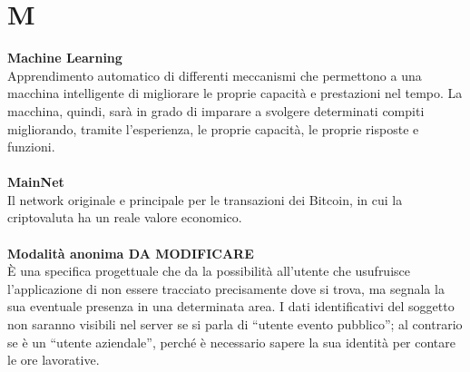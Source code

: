 \section{M}
\textbf{Machine Learning}\\
Apprendimento automatico di differenti meccanismi che permettono a una macchina intelligente di migliorare le proprie capacità e prestazioni nel tempo. La macchina, quindi, sarà in grado di imparare a svolgere determinati compiti migliorando, tramite l’esperienza, le proprie capacità, le proprie risposte e funzioni. \\ \\
\textbf{MainNet}\\
Il network originale e principale per le transazioni dei Bitcoin, in cui la criptovaluta ha un reale valore economico. \\ \\
\textbf{Modalità anonima DA MODIFICARE}\\
È una specifica progettuale che da la possibilità all’utente che usufruisce l’applicazione di non essere tracciato precisamente dove si trova, ma segnala la sua eventuale presenza in una determinata area. I dati identificativi del soggetto non saranno visibili nel server se si parla di “utente evento pubblico”; al contrario se è un “utente aziendale”, perché è necessario sapere la sua identità per contare le ore lavorative. \\ \\
\clearpage